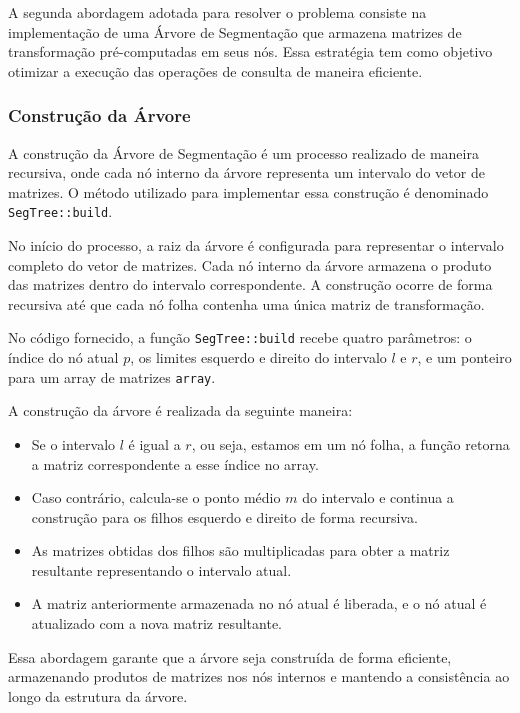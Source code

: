 \documentclass{article}
\begin{document}
A segunda abordagem adotada para resolver o problema consiste na implementação de uma Árvore de Segmentação que armazena matrizes de transformação pré-computadas em seus nós. Essa estratégia tem como objetivo otimizar a execução das operações de consulta de maneira eficiente.

\subsubsection{Construção da Árvore}

A construção da Árvore de Segmentação é um processo realizado de maneira recursiva, onde cada nó interno da árvore representa um intervalo do vetor de matrizes. O método utilizado para implementar essa construção é denominado \texttt{SegTree::build}.

No início do processo, a raiz da árvore é configurada para representar o intervalo completo do vetor de matrizes. Cada nó interno da árvore armazena o produto das matrizes dentro do intervalo correspondente. A construção ocorre de forma recursiva até que cada nó folha contenha uma única matriz de transformação.

No código fornecido, a função \texttt{SegTree::build} recebe quatro parâmetros: o índice do nó atual $p$, os limites esquerdo e direito do intervalo $l$ e $r$, e um ponteiro para um array de matrizes \texttt{array}.

A construção da árvore é realizada da seguinte maneira:

\begin{itemize}
    \item Se o intervalo $l$ é igual a $r$, ou seja, estamos em um nó folha, a função retorna a matriz correspondente a esse índice no array.
    \item Caso contrário, calcula-se o ponto médio $m$ do intervalo e continua a construção para os filhos esquerdo e direito de forma recursiva.
    \item As matrizes obtidas dos filhos são multiplicadas para obter a matriz resultante representando o intervalo atual.
    \item A matriz anteriormente armazenada no nó atual é liberada, e o nó atual é atualizado com a nova matriz resultante.
\end{itemize}

Essa abordagem garante que a árvore seja construída de forma eficiente, armazenando produtos de matrizes nos nós internos e mantendo a consistência ao longo da estrutura da árvore.
\end{document}
